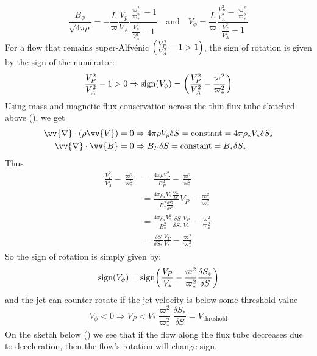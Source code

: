 \documentclass[10pt,a4paper,english]{article}
\let\originalleft\left
\let\originalright\right
\renewcommand{\left}{\mathopen{}\mathclose\bgroup\originalleft}
\renewcommand{\right}{\aftergroup\egroup\originalright}
\begin{document}
\begin{equation}
  \frac{B_\phi}{\sqrt{4\pi\rho}} = - \frac{L}{\varpi}\frac{V_p}{V_A}\frac{\frac{\varpi^2}{\varpi_*^2}-1}{\frac{V_p^2}{V_A^2} - 1} \quad \mathrm{and} \quad
  V_\phi = \frac{L}{\varpi}\frac{\frac{V_P^2}{V_A^2} - \frac{\varpi^2}{\varpi_*^2}}{\frac{V_P^2}{V_A^2}-1}
\end{equation}
For a flow that remains super-Alfvénic $\left(\frac{V_P^2}{V_A^2}-1 > 1\right)$, the sign of rotation is given by the sign of the numerator:
\begin{equation}
  \frac{V_P^2}{V_A^2}- 1 > 0 \Rightarrow \mathrm{sign}\left( V_\phi \right) = \left( \frac{V_P^2}{V_A^2} - \frac{\varpi^2}{\varpi_*^2} \right)
\end{equation}
Using mass and magnetic flux conservation across the thin flux tube sketched above (), we get
\begin{align}
  \vv{\nabla}\cdot \left( \rho\vv{V} \right) = 0 &\Rightarrow 4\pi\rho V_p\delta S = \mathrm{constant} = 4\pi\rho_*V_*\delta S_* \\
  \vv{\nabla}\cdot\vv{B} = 0 & \Rightarrow B_P \delta S = \mathrm{constant} = B_*\delta S_*
\end{align}
Thus
\begin{align}
  \frac{V_P^2}{V_A^2} - \frac{\varpi^2}{\varpi_*^2}
  & = \frac{4\pi\rho V_P^2}{B_P^2} - \frac{\varpi^2}{\varpi_*^2} \\
  & = \frac{4\pi\rho_*V_* \frac{\delta S_*}{\delta S}}{B_*^2 \frac{\delta S_*^2}{\delta S^2}}V_P - \frac{\varpi^2}{\varpi_*^2} \\
  & = \frac{4\pi\rho_*V_*^2}{B_*^2}\frac{\delta S}{\delta S_*} \frac{V_P}{V_*} - \frac{\varpi^2}{\varpi_*^2} \\
  & = \frac{\delta S}{\delta S_*} \frac{V_P}{V_*} - \frac{\varpi^2}{\varpi_*^2}
\end{align}
So the sign of rotation is simply given by:
\begin{equation}
  \mathrm{sign}\left( V_\phi \right) = \mathrm{sign}\left( \frac{V_P}{V_*} - \frac{\varpi^2}{\varpi_*^2} \frac{\delta S_*}{\delta S} \right)
\end{equation}
and the jet can counter rotate if the jet velocity is below some threshold value
\begin{equation}
  V_\phi < 0 \Rightarrow V_P < V_* \frac{\varpi^2}{\varpi_*^2} \frac{\delta S_*}{\delta S} = V_\mathrm{threshold}
\end{equation}
On the sketch below () we see that if the flow along the flux tube decreases due to deceleration, then the flow's rotation will change sign.
\end{document}
